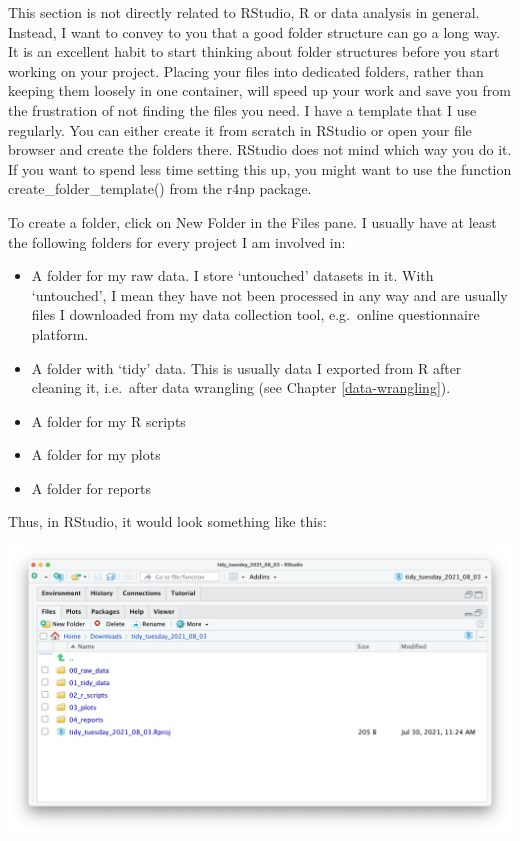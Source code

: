 \documentclass[
]{book}
\begin{document}
This section is not directly related to RStudio, R or data analysis in general. Instead, I want to convey to you that a good folder structure can go a long way. It is an excellent habit to start thinking about folder structures before you start working on your project. Placing your files into dedicated folders, rather than keeping them loosely in one container, will speed up your work and save you from the frustration of not finding the files you need. I have a template that I use regularly. You can either create it from scratch in RStudio or open your file browser and create the folders there. RStudio does not mind which way you do it. If you want to spend less time setting this up, you might want to use the function create\_folder\_template() from the r4np package.

To create a folder, click on New Folder in the Files pane. I usually have at least the following folders for every project I am involved in:

\begin{itemize}
\item
  A folder for my raw data. I store `untouched' datasets in it. With `untouched', I mean they have not been processed in any way and are usually files I downloaded from my data collection tool, e.g.~online questionnaire platform.
\item
  A folder with `tidy' data. This is usually data I exported from R after cleaning it, i.e.~after data wrangling (see Chapter \ref{data-wrangling}).
\item
  A folder for my R scripts
\item
  A folder for my plots
\item
  A folder for reports
\end{itemize}

Thus, in RStudio, it would look something like this:

\includegraphics{images/chapter_06_img/01_organising_work/00_organising_work.png}
\end{document}
